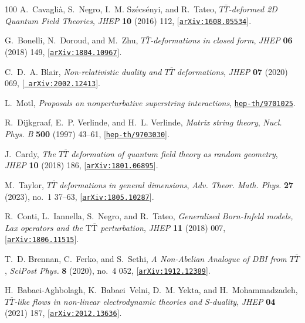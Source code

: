 \documentclass[11pt]{article}
\begin{document}
\begin{thebibliography}{100}
A.~Cavagli\`a, S.~Negro, I.~M. Sz\'ecs\'enyi, and R.~Tateo, {\it {$T
  \bar{T}$-deformed 2D Quantum Field Theories}},  {\em JHEP} {\bf 10} (2016)
  112, [\href{http://arxiv.org/abs/1608.05534}{{\tt arXiv:1608.05534}}].

G.~Bonelli, N.~Doroud, and M.~Zhu, {\it {$T \bar{T}$-deformations in closed
  form}},  {\em JHEP} {\bf 06} (2018) 149,
  [\href{http://arxiv.org/abs/1804.10967}{{\tt arXiv:1804.10967}}].

C.~D.~A. Blair, {\it {Non-relativistic duality and $T \bar T$ deformations}},
  {\em JHEP} {\bf 07} (2020) 069, [\href{http://arxiv.org/abs/2002.12413}{{\tt
  arXiv:2002.12413}}].

L.~Motl, {\it {Proposals on nonperturbative superstring interactions}},
  \href{http://arxiv.org/abs/hep-th/9701025}{{\tt hep-th/9701025}}.

R.~Dijkgraaf, E.~P. Verlinde, and H.~L. Verlinde, {\it {Matrix string theory}},
   {\em Nucl. Phys. B} {\bf 500} (1997) 43--61,
  [\href{http://arxiv.org/abs/hep-th/9703030}{{\tt hep-th/9703030}}].

J.~Cardy, {\it {The $ T\overline{T} $ deformation of quantum field theory as
  random geometry}},  {\em JHEP} {\bf 10} (2018) 186,
  [\href{http://arxiv.org/abs/1801.06895}{{\tt arXiv:1801.06895}}].

M.~Taylor, {\it {$T \bar{T}$ deformations in general dimensions}},  {\em Adv.
  Theor. Math. Phys.} {\bf 27} (2023), no.~1 37--63,
  [\href{http://arxiv.org/abs/1805.10287}{{\tt arXiv:1805.10287}}].

R.~Conti, L.~Iannella, S.~Negro, and R.~Tateo, {\it {Generalised Born-Infeld
  models, Lax operators and the $ \mathrm{T}\overline{\mathrm{T}} $
  perturbation}},  {\em JHEP} {\bf 11} (2018) 007,
  [\href{http://arxiv.org/abs/1806.11515}{{\tt arXiv:1806.11515}}].

T.~D. Brennan, C.~Ferko, and S.~Sethi, {\it {A Non-Abelian Analogue of DBI from
  $T \overline{T}$}},  {\em SciPost Phys.} {\bf 8} (2020), no.~4 052,
  [\href{http://arxiv.org/abs/1912.12389}{{\tt arXiv:1912.12389}}].

H.~Babaei-Aghbolagh, K.~Babaei~Velni, D.~M. Yekta, and H.~Mohammadzadeh, {\it
  {$ T\overline{T} $-like flows in non-linear electrodynamic theories and
  S-duality}},  {\em JHEP} {\bf 04} (2021) 187,
  [\href{http://arxiv.org/abs/2012.13636}{{\tt arXiv:2012.13636}}].


\end{thebibliography}
\end{document}
